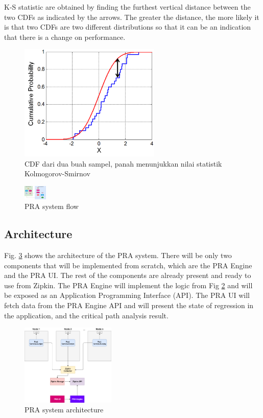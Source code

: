 \documentclass[conference]{configs/IEEEtran}
\begin{document}
K-S statistic are obtained by
finding the furthest vertical distance between the two CDFs as indicated by the arrows. The greater the distance, the more likely it is that two CDFs are two different distributions so that it can be an indication that there is a change
on performance.
\begin{figure}[htb]
	\centering
	\includegraphics[width=0.6\textwidth]{resources/ch2/ks.png}
	\caption{CDF dari dua buah sampel, panah menunjukkan nilai statistik Kolmogorov-Smirnov \cite{wiki:ks-test}}
	\label{ks-example}
\end{figure}




\begin{figure}[!htb]
	\centering
	\includegraphics[width=0.1\textwidth,scale=5]{resources/ch3/alur_v2.png}
	\caption{PRA system flow}
	\label{flow-pra}
\end{figure}

\subsection{Architecture}
Fig. \ref{arch-pra} shows the architecture of the PRA system. There will be only two components that will be implemented from scratch, which are the PRA Engine and the PRA UI. The rest of the components are already present and ready to use from Zipkin. The PRA Engine will implement the logic from Fig \ref{flow-pra} and will be exposed as an Application Programming Interface (API). The PRA UI will fetch data from the PRA Engine API and will present the state of regression in the application, and the critical path analysis result.
\begin{figure}[!htb]
	\centering
	\includegraphics[width=0.4\textwidth]{resources/ch3/arch.png}
	\caption{PRA system architecture}
	\label{arch-pra}
\end{figure}
\end{document}
